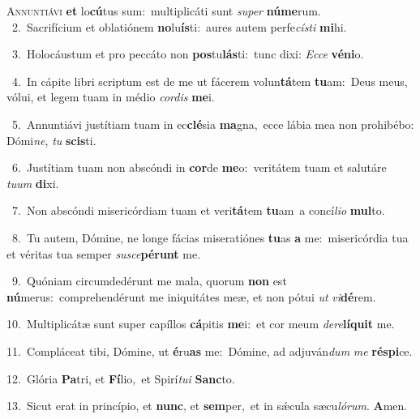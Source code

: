 \lettrine{\initial\textcolor{\initialcolor}{A}}{nnuntiávi} \textbf{et} lo\-\textbf{cú}\-tus sum:~\star multiplicáti sunt \textit{su}\-\textit{per} \textbf{nú}\-\textbf{me}rum.\\
{\numbfont\textcolor{\numbcolor}{~2.}}~Sacrifícium et oblatiónem \textbf{no}\-lu\-\textbf{ís}\-ti:~\star aures autem perfe\-\textit{cís}\-\textit{ti} \textbf{mi}\-hi.\par
{\numbfont\textcolor{\numbcolor}{~3.}}~Holocáustum et pro peccáto non \textbf{pos}\-tu\-\textbf{lás}\-ti:~\star tunc dixi: \textit{Ec}\-\textit{ce} \textbf{vé}\-\textbf{ni}o.\par
{\numbfont\textcolor{\numbcolor}{~4.}}~In cápite libri scriptum est de me ut fácerem volun\-\textbf{tá}\-tem \textbf{tu}\-am:~\star Deus meus, vólui, et legem tuam in médio \textit{cor}\-\textit{dis} \textbf{me}\-i.\par
{\numbfont\textcolor{\numbcolor}{~5.}}~Annuntiávi justítiam tuam in ec\-\textbf{clé}\-sia \textbf{ma}\-gna,~\star ecce lábia mea non prohibébo: Dómi\-\textit{ne}\-, \textit{tu} \textbf{scis}\-ti.\par
{\numbfont\textcolor{\numbcolor}{~6.}}~Justítiam tuam non abscóndi in \textbf{cor}\-de \textbf{me}\-o:~\star veritátem tuam et salutáre \textit{tu}\-\textit{um} \textbf{di}\-xi.\par
{\numbfont\textcolor{\numbcolor}{~7.}}~Non abscóndi misericórdiam tuam et veri\-\textbf{tá}\-tem \textbf{tu}\-am~\star a concí\-\textit{li}\-\textit{o} \textbf{mul}\-to.\par
{\numbfont\textcolor{\numbcolor}{~8.}}~Tu autem, Dómine, ne longe fácias miseratiónes \textbf{tu}\-as \textbf{a} me:~\star misericórdia tua et véritas tua semper \textit{su}\-\textit{sce}\textbf{pé}\textbf{runt} me.\par
{\numbfont\textcolor{\numbcolor}{~9.}}~Quóniam circumdedérunt me mala, quorum \textbf{non} est \textbf{nú}\-merus:~\star comprehendérunt me iniquitátes meæ, et non pótui \textit{ut} \textit{vi}\-\textbf{dé}rem.\par
{\numbfont\textcolor{\numbcolor}{10.}}~Multiplicátæ sunt super capíllos \textbf{cá}\-pitis \textbf{me}\-i:~\star et cor meum \textit{de}\-\textit{re}\textbf{lí}\textbf{quit} me.\par
{\numbfont\textcolor{\numbcolor}{11.}}~Compláceat tibi, Dómine, ut \textbf{é}\-ru\textbf{as} me:~\star Dómine, ad adjuván\textit{dum} \textit{me} \textbf{ré}\-\textbf{spi}ce.\par
{\numbfont\textcolor{\numbcolor}{12.}}~Glória \textbf{Pa}\-tri, et \textbf{Fí}\-lio,~\star et Spirí\-\textit{tu}\-\textit{i} \textbf{Sanc}\-to.\par
{\numbfont\textcolor{\numbcolor}{13.}}~Sicut erat in princípio, et \textbf{nunc}\-, et \textbf{sem}\-per,~\star et in sǽcula sæcu\-\textit{ló}\-\textit{rum}. \textbf{A}\-men.\par
